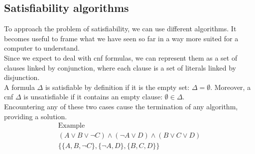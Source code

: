\subsection*{Satisfiability algorithms}

To approach the problem of satisfiability, we can use different algorithms.
It becomes useful to frame what we have seen so far in a way more suited for a computer to understand. \\
Since we expect to deal with \gls{cnf} formulas, we can represent them as a set of clauses linked by conjunction, where each clause is a set of literals linked by disjunction. \\
A formula $\Delta$ is satisfiable by definition if it is the empty set: $\Delta = \emptyset$.
Moreover, a \gls{cnf} $\Delta$ is unsatisfiable if it contains an empty clause: $\emptyset \in \Delta$. \\
Encountering any of these two cases cause the termination of any algorithm, providing a solution. \\

\begin{multline*}
    \text{Example} \\
    (A \lor B \lor \neg C) \land (\neg A \lor D) \land (B \lor C \lor D) \\
    \{ \{A, B, \neg C\}, \{\neg A, D\}, \{B, C, D\}\} \\
\end{multline*}

